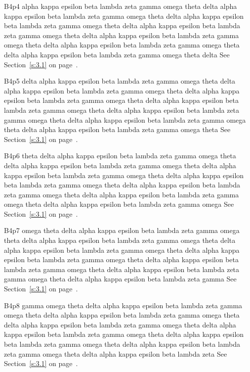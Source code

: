 B4p4 alpha kappa epsilon beta lambda zeta gamma omega theta delta alpha kappa epsilon beta lambda zeta gamma omega theta delta alpha kappa epsilon beta lambda zeta gamma omega theta delta alpha kappa epsilon beta lambda zeta gamma omega theta delta alpha kappa epsilon beta lambda zeta gamma omega theta delta alpha kappa epsilon beta lambda zeta gamma omega theta delta alpha kappa epsilon beta lambda zeta gamma omega theta delta See Section~\ref{s:3.1} on page~\pageref{s:3.1}.

B4p5 delta alpha kappa epsilon beta lambda zeta gamma omega theta delta alpha kappa epsilon beta lambda zeta gamma omega theta delta alpha kappa epsilon beta lambda zeta gamma omega theta delta alpha kappa epsilon beta lambda zeta gamma omega theta delta alpha kappa epsilon beta lambda zeta gamma omega theta delta alpha kappa epsilon beta lambda zeta gamma omega theta delta alpha kappa epsilon beta lambda zeta gamma omega theta See Section~\ref{s:3.1} on page~\pageref{s:3.1}.

B4p6 theta delta alpha kappa epsilon beta lambda zeta gamma omega theta delta alpha kappa epsilon beta lambda zeta gamma omega theta delta alpha kappa epsilon beta lambda zeta gamma omega theta delta alpha kappa epsilon beta lambda zeta gamma omega theta delta alpha kappa epsilon beta lambda zeta gamma omega theta delta alpha kappa epsilon beta lambda zeta gamma omega theta delta alpha kappa epsilon beta lambda zeta gamma omega See Section~\ref{s:3.1} on page~\pageref{s:3.1}.

B4p7 omega theta delta alpha kappa epsilon beta lambda zeta gamma omega theta delta alpha kappa epsilon beta lambda zeta gamma omega theta delta alpha kappa epsilon beta lambda zeta gamma omega theta delta alpha kappa epsilon beta lambda zeta gamma omega theta delta alpha kappa epsilon beta lambda zeta gamma omega theta delta alpha kappa epsilon beta lambda zeta gamma omega theta delta alpha kappa epsilon beta lambda zeta gamma See Section~\ref{s:3.1} on page~\pageref{s:3.1}.

B4p8 gamma omega theta delta alpha kappa epsilon beta lambda zeta gamma omega theta delta alpha kappa epsilon beta lambda zeta gamma omega theta delta alpha kappa epsilon beta lambda zeta gamma omega theta delta alpha kappa epsilon beta lambda zeta gamma omega theta delta alpha kappa epsilon beta lambda zeta gamma omega theta delta alpha kappa epsilon beta lambda zeta gamma omega theta delta alpha kappa epsilon beta lambda zeta See Section~\ref{s:3.1} on page~\pageref{s:3.1}.

